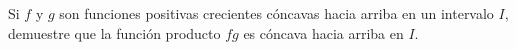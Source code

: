 \item Si $f$ y $g$ son funciones positivas crecientes cóncavas hacia arriba en un intervalo $I$, demuestre que la función producto $fg$ es cóncava hacia arriba en $I$.
